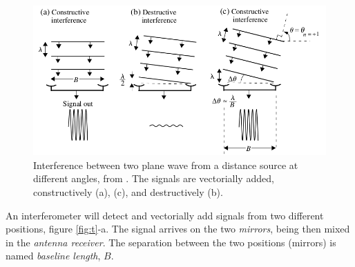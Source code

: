 \begin{figure}[htb]
\begin{center}
\includegraphics[scale=0.55]{figs/inter.png}
\caption{Interference between two plane wave from a distance source at different angles, from \cite{brand}. The signals are vectorially added, constructively (a), (c), and destructively  (b). }
 \end{center}
\label{int}
\end{figure}



An interferometer will detect and vectorially add signals from two different positions, figure \ref{fig:t}-a. The signal arrives on the two {\it mirrors}, being then mixed in the {\it antenna receiver}. The separation between the two positions (mirrors) is named {\it baseline length}, $B$.

